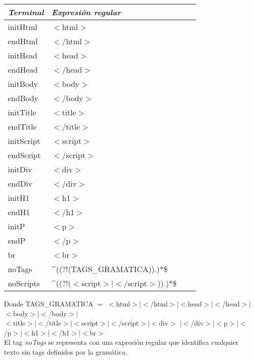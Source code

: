 \begin{center}
    \begin{tabular}{| l | l | l | p{5cm} |}
    \hline
    \textbf{\textit{Terminal}} 	& \textbf{\textit{Expresi\'on regular}} 	\\ \hline
    initHtml 		& $<$html$>$ 			 \\ \hline
    endHtml  		& $<$/html$>$  			 \\ \hline
    initHead		& $<$head$>$ 			 \\ \hline
    endHead	 	& $<$/head$>$ 			 \\ \hline
    initBody 		& $<$body$>$ 			 \\ \hline
    endBody		& $<$/body$>$  			 \\ \hline
    initTitle 		& $<$title$>$ 			 \\ \hline
    endTitle  		& $<$/title$>$ 			 \\ \hline
    initScript		& $<$script$>$ 			 \\ \hline
    endScript		& $<$/script$>$  			 \\ \hline
    initDiv		& $<$div$>$ 			 \\ \hline
    endDiv		&  $<$/div$>$ 			 \\ \hline
    initH1		& $<$h1$>$ 			 \\ \hline
    endH1		& $<$/h1$>$  			 \\ \hline
    initP 		& $<$p$>$ 				 \\ \hline
    endP 		& $<$/p$>$ 				 \\ \hline
    br			&$<$br$>$ 				 \\ \hline
    noTags		& \string^((?!(TAGS\_GRAMATICA)).)*\$  			 \\ \hline
    noScripts 		&  \string^((?!($<$script$>\vert<$/script$>$)).)*\$		 \\ \hline

    \end{tabular}
\end{center}

Donde TAGS\_GRAMATICA $=$ $<$html$>$$\vert$$<$/html$>$$\vert$$<$head$>$$\vert$$<$/head$>$$\vert$$<$body$>$$\vert$$<$/body$>$$\vert$ \\
\indent \indent $<$title$>$$\vert$$<$/title$>$$\vert$$<$script$>$$\vert$$<$/script$>$$\vert$$<$div$>$
$\vert$$<$/div$>$$\vert$$<$p$>$$\vert$$<$/p$>$$\vert$$<$h1$>$$\vert$$<$/h1$>$$\vert$$<$br$>$\\

El tag \textit{noTags} se representa con una expresi\'on regular que identifica cualquier texto sin tags definidos por la gram\'atica.\\


